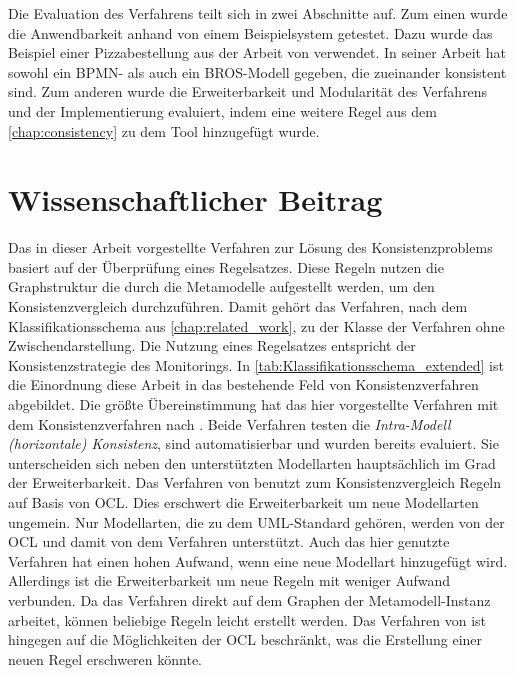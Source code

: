 Die Evaluation des Verfahrens teilt sich in zwei Abschnitte auf.
Zum einen wurde die Anwendbarkeit anhand von einem Beispielsystem getestet.
Dazu wurde das Beispiel einer Pizzabestellung aus der Arbeit von \cite{Schoen} verwendet.
In seiner Arbeit hat \cite{Schoen} sowohl ein BPMN- als auch ein BROS-Modell gegeben, die zueinander konsistent sind.
Zum anderen wurde die Erweiterbarkeit und Modularität des Verfahrens und der Implementierung evaluiert, indem eine weitere Regel aus dem \cref{chap:consistency} zu dem Tool hinzugefügt wurde.

\section{Wissenschaftlicher Beitrag}

Das in dieser Arbeit vorgestellte Verfahren zur Lösung des Konsistenzproblems basiert auf der Überprüfung eines Regelsatzes.
Diese Regeln nutzen die Graphstruktur die durch die Metamodelle aufgestellt werden, um den Konsistenzvergleich durchzuführen.
Damit gehört das Verfahren, nach dem Klassifikationsschema aus \cref{chap:related_work}, zu der Klasse der Verfahren ohne Zwischendarstellung.
Die Nutzung eines Regelsatzes entspricht der Konsistenzstrategie des Monitorings.
In \cref{tab:Klassifikationsschema_extended} ist die Einordnung diese Arbeit in das bestehende Feld von Konsistenzverfahren abgebildet.
Die größte Übereinstimmung hat das hier vorgestellte Verfahren mit dem Konsistenzverfahren nach \cite{Egyed2006}.
Beide Verfahren testen die \emph{Intra-Modell (horizontale) Konsistenz}, sind automatisierbar und wurden bereits evaluiert.
Sie unterscheiden sich neben den unterstützten Modellarten hauptsächlich im Grad der Erweiterbarkeit.
Das Verfahren von \cite{Egyed2006} benutzt zum Konsistenzvergleich Regeln auf Basis von OCL.
Dies erschwert die Erweiterbarkeit um neue Modellarten ungemein.
Nur Modellarten, die zu dem UML-Standard gehören, werden von der OCL und damit von dem Verfahren unterstützt.
Auch das hier genutzte Verfahren hat einen hohen Aufwand, wenn eine neue Modellart hinzugefügt wird.
Allerdings ist die Erweiterbarkeit um neue Regeln mit weniger Aufwand verbunden.
Da das Verfahren direkt auf dem Graphen der Metamodell-Instanz arbeitet, können beliebige Regeln leicht erstellt werden.
Das Verfahren von \cite{Egyed2006} ist hingegen auf die Möglichkeiten der OCL beschränkt, was die Erstellung einer neuen Regel erschweren könnte.

